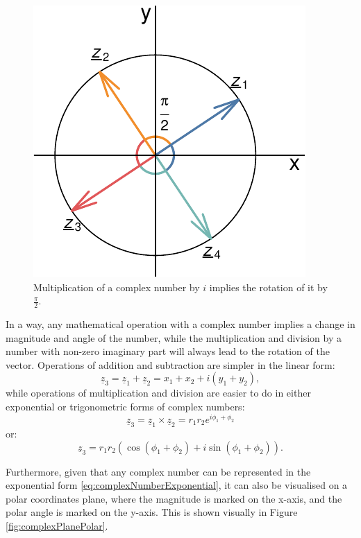 \documentclass[
]{book}
\begin{document}
\begin{figure}
\centering
\includegraphics{Svetunkov---Svetunkov---Complex-Valued-Econometrics_files/figure-latex/complexPlaneMultiplication-1.pdf}
\caption{\label{fig:complexPlaneMultiplication}Multiplication of a complex number by \(i\) implies the rotation of it by \(\frac{\pi}{2}\).}
\end{figure}

In a way, any mathematical operation with a complex number implies a change in magnitude and angle of the number, while the multiplication and division by a number with non-zero imaginary part will always lead to the rotation of the vector. Operations of addition and subtraction are simpler in the linear form:
\begin{equation*}
    \underline{z}_3 = \underline{z}_1 + \underline{z}_2 = x_1 + x_2 + i (y_1 + y_2) ,
\end{equation*}
while operations of multiplication and division are easier to do in either exponential or trigonometric forms of complex numbers:
\begin{equation*}
    \underline{z}_3 = \underline{z}_1 \times \underline{z}_2 = r_1 r_2 e^{i \phi_1 + \phi_2} 
\end{equation*}
or:
\begin{equation*}
    \underline{z}_3 = r_1 r_2 \left(\cos (\phi_1 + \phi_2) + i \sin (\phi_1 + \phi_2) \right) .
\end{equation*}

Furthermore, given that any complex number can be represented in the exponential form \eqref{eq:complexNumberExponential}, it can also be visualised on a polar coordinates plane, where the magnitude is marked on the x-axis, and the polar angle is marked on the y-axis. This is shown visually in Figure \ref{fig:complexPlanePolar}.
\end{document}
